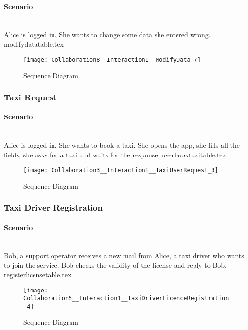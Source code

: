 \paragraph{Scenario} \hfill \\
Alice is logged in. She wants to change some data she entered wrong. 
{modifydatatable.tex}
\newpage
\vfill
\begin{figure}
\caption{Sequence Diagram}
\texttt{[image: Collaboration8\_\_Interaction1\_\_ModifyData\_7]}
\centering
\end{figure}
\vfill
\clearpage

\subsubsection{Taxi Request} 
\label{ssub:taxirequest_scenario}
\paragraph{Scenario} \hfill \\
Alice is logged in. She wants to book a taxi. She opens the app, she fills all the fields, she asks for a taxi and waits for the response.
{userbooktaxitable.tex}
\newpage
\vfill
\begin{figure}
\caption{Sequence Diagram}
\texttt{[image: Collaboration3\_\_Interaction1\_\_TaxiUserRequest\_3]}
\centering
\end{figure}
\vfill
\clearpage

\subsubsection{Taxi Driver Registration} 
\label{ssub:taxidriverregisration_scenario}
\paragraph{Scenario} \hfill \\
Bob, a support operator receives a new mail from Alice, a taxi driver who wants to join the service. Bob checks the validity of the license and reply to Bob.
{registerlicensetable.tex}
\newpage
\vfill
\begin{figure}
\caption{Sequence Diagram}
\texttt{[image: Collaboration5\_\_Interaction1\_\_TaxiDriverLicenceRegistration\_4]}
\centering
\end{figure}
\vfill
\clearpage

